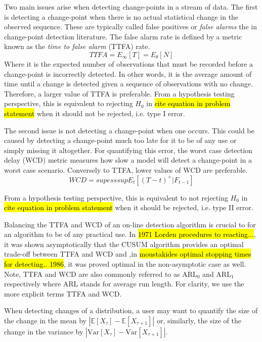 Two main issues arise when detecting change-points in a stream of data. The first is detecting a change-point when there is no actual statistical change in the observed sequence. These are typically called false positives or \textit{false alarms} the in change-point detection literature. The false alarm rate is defined by a metric known as the \textit{time to false alarm} (TTFA) rate. 
\begin{equation}
TTFA = E_{\infty}[T] = E_{\theta}[N]
\end{equation}
Where it is the expected number of observations that must be recorded before a change-point is incorrectly detected. In other words, it is the average amount of time until a change is detected given a sequence of observations with no change. Therefore, a larger value of TTFA is preferable. From a hypothesis testing perspective, this is equivalent to rejecting $H_0$ in \hl{cite equation in problem statement} when it should not be rejected, i.e. type I error.

The second issue is not detecting a change-point when one occurs. This could be caused by detecting a change-point much too late for it to be of any use or simply missing it altogether. For quantifying this error, the worst case detection delay (WCD) metric measures how slow a model will detect a  change-point in a worst case scenario. Conversely to TTFA, lower values of WCD are preferable.
\begin{equation}
WCD = sup esssup E_t[(T-t)^+ | F_{t-1}]
\end{equation}

From a hypothesis testing perspective, this is equivalent to not rejecting $H_0$ in \hl{cite equation in problem statement} when it should be rejected, i.e. type II error.

Balancing the TTFA and WCD of an on-line detection algorithm is crucial to for an algorithm to be of any practical use. In \hl{1971 Lorden procedures to reacting...}, it was shown asymptotically that the CUSUM algorithm provides an optimal trade-off between TTFA and WCD and ,in \hl{moustakides optimal stopping times for detecting.. 1986}, it was proved optimal in the non-asymptotic case as well. Note, TTFA and WCD are also commonly referred to as ARL$_0$ and ARL$_1$ respectively where ARL stands for average run length. For clarity, we use the more explicit terms TTFA and WCD.

When detecting changes of a distribution, a user may want to quantify the size of the change in the mean by
$|\mathbb{E}[X_{\tau}]-\mathbb{E}[X_{\tau+1}]|$ or, similarly, the size of the change in the variance by $|\text{Var}[X_{\tau}]-\text{Var}[X_{\tau+1}]|$.


